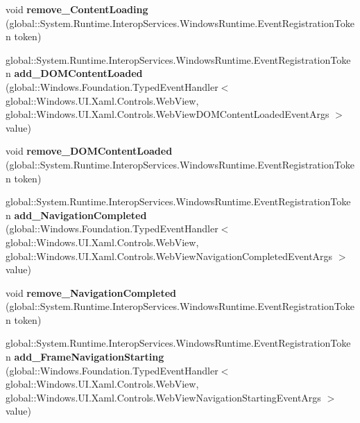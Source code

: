\begin{DoxyCompactItemize}
void {\bfseries remove\+\_\+\+Content\+Loading} (global\+::\+System.\+Runtime.\+Interop\+Services.\+Windows\+Runtime.\+Event\+Registration\+Token token)
\item 
\mbox{\label{interface_windows_1_1_u_i_1_1_xaml_1_1_controls_1_1_i_web_view2_ad7b79a31e2034f7e2d82141d4fb98882}} 
global\+::\+System.\+Runtime.\+Interop\+Services.\+Windows\+Runtime.\+Event\+Registration\+Token {\bfseries add\+\_\+\+D\+O\+M\+Content\+Loaded} (global\+::\+Windows.\+Foundation.\+Typed\+Event\+Handler$<$ global\+::\+Windows.\+U\+I.\+Xaml.\+Controls.\+Web\+View, global\+::\+Windows.\+U\+I.\+Xaml.\+Controls.\+Web\+View\+D\+O\+M\+Content\+Loaded\+Event\+Args $>$ value)
\item 
\mbox{\label{interface_windows_1_1_u_i_1_1_xaml_1_1_controls_1_1_i_web_view2_a4826b2efe9b800c1e85e3a78e742e78c}} 
void {\bfseries remove\+\_\+\+D\+O\+M\+Content\+Loaded} (global\+::\+System.\+Runtime.\+Interop\+Services.\+Windows\+Runtime.\+Event\+Registration\+Token token)
\item 
\mbox{\label{interface_windows_1_1_u_i_1_1_xaml_1_1_controls_1_1_i_web_view2_ac4ba94ee4e34e6437000d0e1f34a76cf}} 
global\+::\+System.\+Runtime.\+Interop\+Services.\+Windows\+Runtime.\+Event\+Registration\+Token {\bfseries add\+\_\+\+Navigation\+Completed} (global\+::\+Windows.\+Foundation.\+Typed\+Event\+Handler$<$ global\+::\+Windows.\+U\+I.\+Xaml.\+Controls.\+Web\+View, global\+::\+Windows.\+U\+I.\+Xaml.\+Controls.\+Web\+View\+Navigation\+Completed\+Event\+Args $>$ value)
\item 
\mbox{\label{interface_windows_1_1_u_i_1_1_xaml_1_1_controls_1_1_i_web_view2_a7c6af1243cf0100a4028f3aaaf48f8b2}} 
void {\bfseries remove\+\_\+\+Navigation\+Completed} (global\+::\+System.\+Runtime.\+Interop\+Services.\+Windows\+Runtime.\+Event\+Registration\+Token token)
\item 
\mbox{\label{interface_windows_1_1_u_i_1_1_xaml_1_1_controls_1_1_i_web_view2_ad33eb6ddf290983e9f6e350de4ac2d33}} 
global\+::\+System.\+Runtime.\+Interop\+Services.\+Windows\+Runtime.\+Event\+Registration\+Token {\bfseries add\+\_\+\+Frame\+Navigation\+Starting} (global\+::\+Windows.\+Foundation.\+Typed\+Event\+Handler$<$ global\+::\+Windows.\+U\+I.\+Xaml.\+Controls.\+Web\+View, global\+::\+Windows.\+U\+I.\+Xaml.\+Controls.\+Web\+View\+Navigation\+Starting\+Event\+Args $>$ value)

\end{DoxyCompactItemize}
